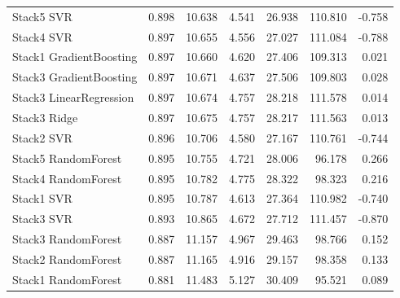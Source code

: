 \begin{longtable}{lrrrrrr}
    Stack5 SVR & 0.898 & 10.638 & 4.541 & 26.938 & 110.810 & -0.758 \\
    Stack4 SVR & 0.897 & 10.655 & 4.556 & 27.027 & 111.084 & -0.788 \\
    Stack1 GradientBoosting & 0.897 & 10.660 & 4.620 & 27.406 & 109.313 & 0.021 \\
    Stack3 GradientBoosting & 0.897 & 10.671 & 4.637 & 27.506 & 109.803 & 0.028 \\
    Stack3 LinearRegression & 0.897 & 10.674 & 4.757 & 28.218 & 111.578 & 0.014 \\
    Stack3 Ridge & 0.897 & 10.675 & 4.757 & 28.217 & 111.563 & 0.013 \\
    Stack2 SVR & 0.896 & 10.706 & 4.580 & 27.167 & 110.761 & -0.744 \\
    Stack5 RandomForest & 0.895 & 10.755 & 4.721 & 28.006 & 96.178 & 0.266 \\
    Stack4 RandomForest & 0.895 & 10.782 & 4.775 & 28.322 & 98.323 & 0.216 \\
    Stack1 SVR & 0.895 & 10.787 & 4.613 & 27.364 & 110.982 & -0.740 \\
    Stack3 SVR & 0.893 & 10.865 & 4.672 & 27.712 & 111.457 & -0.870 \\
    Stack3 RandomForest & 0.887 & 11.157 & 4.967 & 29.463 & 98.766 & 0.152 \\
    Stack2 RandomForest & 0.887 & 11.165 & 4.916 & 29.157 & 98.358 & 0.133 \\
    Stack1 RandomForest & 0.881 & 11.483 & 5.127 & 30.409 & 95.521 & 0.089 \\
\end{longtable}

